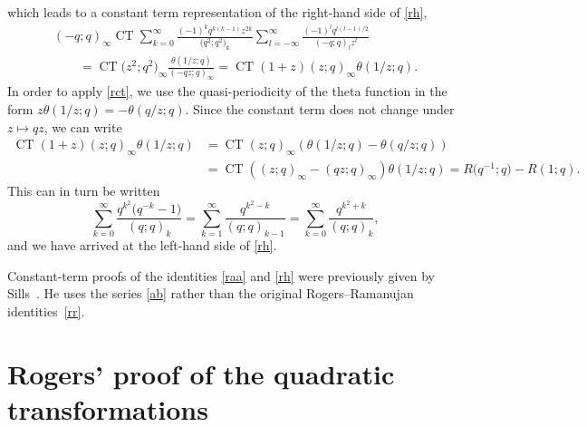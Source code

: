 \documentclass[pdftex]{sigma}
\numberwithin{equation}{section}
\newcommand{\ct}{\operatorname{CT}}
\begin{document}
which leads to a constant term representation of the right-hand side of \eqref{rh},
 \begin{gather*}(-q;q)_\infty\ct \sum_{k=0}^\infty\frac{(-1)^kq^{k(k-1)}z^{2k}}{\bigl(q^2;q^2\bigr)_k}\sum_{l=-\infty}^\infty\frac{(-1)^{l}q^{l(l-1)/2}}{(-q;q)_{l}z^l}\\
 \qquad=\ct \bigl(z^2;q^2\bigr)_\infty\frac{\theta(1/z;q)}{(-qz;q)_\infty}=\ct(1+z)(z;q)_\infty\theta(1/z;q).
 \end{gather*}
 In order to apply \eqref{rct}, we use the quasi-periodicity of the theta function in the form $z\theta(1/z;q)=-\theta(q/z;q)$.
 Since the constant term does not change under $z\mapsto qz$, we can write
 \begin{align*}
 \ct(1+z)(z;q)_\infty\theta(1/z;q)&=\ct (z;q)_\infty(\theta(1/z;q)-\theta(q/z;q))\\
 &=\ct((z;q)_\infty-(qz;q)_\infty)\theta(1/z;q)=R\bigl(q^{-1};q\bigr)-R(1;q).
 \end{align*}
 This can in turn be written
 \begin{equation*}
 \sum_{k=0}^\infty\frac{q^{k^2}\bigl(q^{-k}-1\bigr)}{(q;q)_k}=\sum_{k=1}^\infty\frac{q^{k^2-k}}{(q;q)_{k-1}}=\sum_{k=0}^\infty\frac{q^{k^2+k}}{(q;q)_{k}}, \end{equation*}
and we have arrived at the left-hand side of \eqref{rh}.

Constant-term proofs of the identities \eqref{raa} and \eqref{rh} were previously given by Sills~\cite{sm}.
He uses the series \eqref{ab} rather than the original Rogers--Ramanujan identities~\eqref{rr}.

\section{Rogers' proof of the quadratic transformations}\label{rpss}
\end{document}
